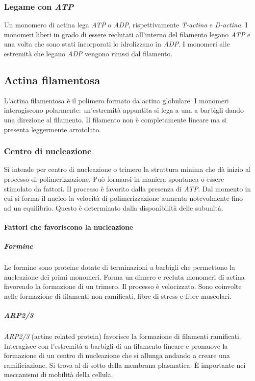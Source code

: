 		\subsubsection{Legame con \emph{ATP}}
		Un monomero di actina lega \emph{ATP} o \emph{ADP}, rispettivamente \emph{T-actina} e \emph{D-actina}.
		I monomeri liberi in grado di essere reclutati all'interno del filamento legano \emph{ATP} e una volta che sono stati incorporati lo idrolizzano in \emph{ADP}.
		I monomeri alle estremit\`a che legano \emph{ADP} vengono rimssi dal filamento.

	\subsection{Actina filamentosa}
	L'actina filamentosa \`e il polimero formato da actina globulare.
	I monomeri interagiscono polarmente: un'estremit\`a appuntita si lega a una a barbigli dando una direzione al filamento.
	Il filamento non \`e completamente lineare ma si presenta leggermente arrotolato.


		\subsubsection{Centro di nucleazione}
		Si intende per centro di nucleazione o trimero la struttura minima che d\`a inizio al processo di polimerizzazione.
		Pu\`o formarsi in maniera spontanea o essere stimolato da fattori.
		Il processo \`e favorito dalla presenza di \emph{ATP}.
		Dal momento in cui si forma il nucleo la velocit\`a di polimerizzazione aumenta notevolmente fino ad un equilibrio.
		Questo \`e determinato dalla disponibilit\`a delle subunit\`a.

		\paragraph{Fattori che favoriscono la nucleazione}

			\subparagraph{Formine}
			Le formine sono proteine dotate di terminazioni a barbigli che permettono la nucleazione dei primi monomeri.
			Forma un dimero e recluta monomeri di actina favorendo la formazione di un trimero.
			Il processo \`e velocizzato.
			Sono coinvolte nelle formazione di filamenti non ramificati, fibre di stress e fibre muscolari.

			\subparagraph{\emph{ARP2/3}}
			\emph{ARP2/3} (actine related protein) favorisce la formazione di filamenti ramificati.
			Interagisce con l'estremit\`a a barbigli di un filamento lineare e promuove la formazione di un centro di nucleazione che si allunga andando a creare una ramificiazione.
			Si trova al di sotto della membrana plasmatica.
			\`E importante nei meccanismi di mobilit\`a della cellula.
		
